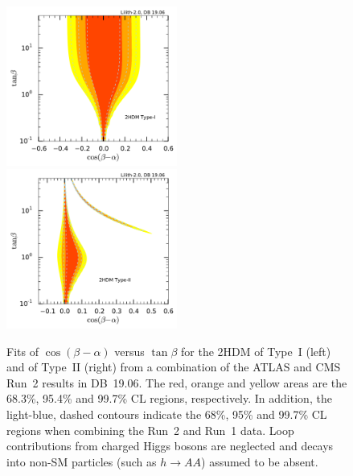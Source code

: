\begin{figure}[h!]\centering
\includegraphics[width=0.5\textwidth]{fits/2HDM-type1.pdf}%
\includegraphics[width=0.5\textwidth]{fits/2HDM-type2.pdf}%
\vspace*{-2mm}
\caption{Fits of $\cos(\beta-\alpha)$ versus $\tan\beta$ for the 2HDM of Type~I (left) and of Type~II (right) 
from a combination of the ATLAS and CMS Run~2 results in DB~19.06. 
The red, orange and yellow areas are the 68.3\%, 95.4\% and 99.7\% CL regions, respectively. 
In addition, the light-blue, dashed contours indicate the 68\%, 95\% and 99.7\% CL regions when combining the Run~2 and Run~1 data. 
Loop contributions from charged Higgs bosons are neglected and decays into non-SM particles (such as $h\to AA$) assumed to be absent.}
\label{fig:2hdm-fit}
\end{figure}
